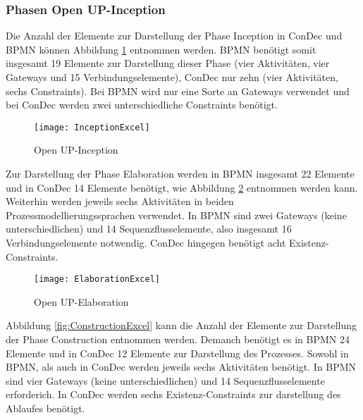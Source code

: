 \subsubsection {Phasen Open UP-Inception}

Die Anzahl der Elemente zur Darstellung der Phase Inception in ConDec und BPMN können Abbildung \ref{fig:InceptionExcel} entnommen werden. BPMN benötigt somit insgesamt 19 Elemente zur Darstellung dieser Phase (vier Aktivitäten, vier Gateways und 15 Verbindungselemente), ConDec nur zehn (vier Aktivitäten, sechs Constraints). Bei BPMN wird nur eine Sorte an Gateways verwendet und bei ConDec werden zwei unterschiedliche Constraints benötigt.\newline
\begin{figure}[htp]
\begin{center}
  \texttt{[image: InceptionExcel]} %
  \caption{Open UP-Inception}
  \label{fig:InceptionExcel}
\end{center}
\end{figure}

Zur Darstellung der Phase Elaboration werden in BPMN insgesamt 22 Elemente und in ConDec 14 Elemente benötigt, wie Abbildung \ref{fig:ElaborationExcel} entnommen werden kann. Weiterhin werden jeweils sechs Aktivitäten in beiden Prozessmodellierungssprachen verwendet. In BPMN sind zwei Gateways (keine unterschiedlichen) und 14 Sequenzflusselemente, also insgesamt 16 Verbindungselemente notwendig. ConDec hingegen benötigt acht Existenz-Constraints. \newline

\begin{figure}[htp]
\begin{center}
  \texttt{[image: ElaborationExcel]} %
  \caption{Open UP-Elaboration}
  \label{fig:ElaborationExcel}
\end{center}
\end{figure}

Abbildung \ref{fig:ConstructionExcel} kann die Anzahl der Elemente zur Darstellung der Phase Construction entnommen werden. Demanch benötigt es in BPMN 24 Elemente und in ConDec 12 Elemente zur Darstellung des Prozesses. Sowohl in BPMN, als auch in ConDec werden jeweils sechs Aktivitäten benötigt. In BPMN sind vier Gateways (keine unterschiedlichen) und 14 Sequenzflusselemente erforderich. In ConDec werden sechs Existenz-Constraints zur darstellung des Ablaufes benötigt.\newline

